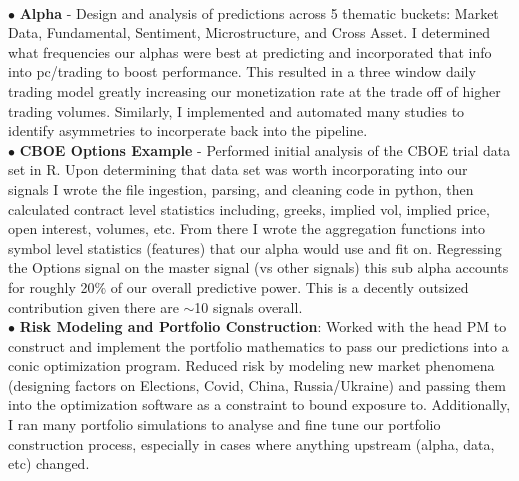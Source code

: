 \documentclass[a4paper,20pt]{article}
\begin{document}
               { \\$\bullet$ \textbf{Alpha} - Design and analysis of predictions across 5 thematic buckets: Market Data, Fundamental, Sentiment, Microstructure, and
                 Cross Asset. I determined what frequencies our alphas were best at predicting and incorporated that info into pc/trading to boost performance.
                 This resulted in a three window daily trading model greatly increasing our monetization rate at the trade off of higher trading volumes.
                 Similarly, I implemented and automated many studies to identify asymmetries to incorperate back into the pipeline.
                 \\$\bullet$ \textbf{CBOE Options Example} - Performed initial analysis of the CBOE trial data set in R. Upon determining that data set was worth
                 incorporating into our signals I wrote the file ingestion, parsing, and cleaning code in python, then calculated contract level statistics including, greeks,
                 implied vol, implied price, open interest, volumes, etc. From there I wrote the aggregation functions into symbol level statistics (features) that our alpha would use and fit on.
                 Regressing the Options signal on the master signal (vs other signals) this sub alpha accounts for roughly 20$\%$ of our overall predictive power. This is a
                 decently outsized contribution given there are $\sim$10 signals overall.
                 \\$\bullet$ \textbf{Risk Modeling and Portfolio Construction}: Worked with the head PM to construct and implement the portfolio mathematics
                 to pass our predictions into a conic optimization program. Reduced risk by modeling new market phenomena (designing factors on Elections, Covid, China, Russia/Ukraine) and passing them
                 into the optimization software as a constraint to bound exposure to. Additionally, I ran many portfolio simulations to analyse and fine tune our portfolio construction process,
                 especially in cases where anything upstream (alpha, data, etc) changed.
               }
\end{document}
